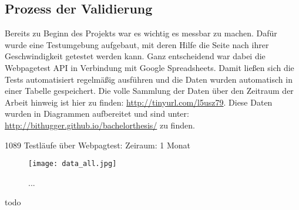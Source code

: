 	\subsection{Prozess der Validierung}
	\label{sub:prozess_der_validierung}
		Bereits zu Beginn des Projekts war es wichtig es messbar zu machen. Dafür wurde eine Testumgebung aufgebaut, mit deren Hilfe die Seite nach ihrer Geschwindigkeit getestet werden kann. Ganz entscheidend war dabei die Webpagetest API in Verbindung mit Google Spreadsheets. Damit ließen sich die Tests automatisiert regelmäßig ausführen und die Daten wurden automatisch in einer Tabelle gespeichert. Die volle Sammlung der Daten über den Zeitraum der Arbeit hinweig ist hier zu finden: \url{http://tinyurl.com/l5usz79}. Diese Daten wurden in Diagrammen aufbereitet und sind unter: \url{http://bithugger.github.io/bachelorthesis/} zu finden.

	1089 Testläufe über Webpagtest: Zeiraum: 1 Monat

	\begin{figure}[htbp]
		\begin{center}
			\texttt{[image: data\_all.jpg]}
			\caption{...}
			\label{fig:data_all}
		\end{center}
	\end{figure}
	
	todo
	

	

